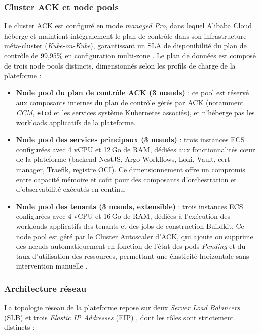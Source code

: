\subsubsection*{Cluster ACK et node pools}

Le cluster ACK est configuré en mode \textit{managed Pro}, dans lequel Alibaba Cloud héberge et maintient intégralement le plan de contrôle dans son infrastructure méta-cluster (\textit{Kube-on-Kube}), garantissant un SLA de disponibilité du plan de contrôle de 99,95\% en configuration multi-zone \cite{ack-ha}. Le plan de données est composé de trois node pools distincts, dimensionnés selon les profils de charge de la plateforme :

\begin{itemize}
	\item \textbf{Node pool du plan de contrôle ACK (3 nœuds)} : ce pool est réservé aux composants internes du plan de contrôle gérés par ACK (notamment \textit{CCM}, \texttt{etcd} et les services système Kubernetes associés), et n'héberge pas les workloads applicatifs de la plateforme.
	\item \textbf{Node pool des services principaux (3 nœuds)} : trois instances ECS configurées avec 4 vCPU et 12\,Go de RAM, dédiées aux fonctionnalités cœur de la plateforme (backend NestJS, Argo Workflows, Loki, Vault, cert-manager, Traefik, registre OCI). Ce dimensionnement offre un compromis entre capacité mémoire et coût pour des composants d'orchestration et d'observabilité exécutés en continu.
	\item \textbf{Node pool des tenants (3 nœuds, extensible)} : trois instances ECS configurées avec 4 vCPU et 16\,Go de RAM, dédiées à l'exécution des workloads applicatifs des tenants et des jobs de construction Buildkit. Ce node pool est géré par le Cluster Autoscaler d'ACK, qui ajoute ou supprime des nœuds automatiquement en fonction de l'état des pods \textit{Pending} et du taux d'utilisation des ressources, permettant une élasticité horizontale sans intervention manuelle \cite{ack-overview}.
\end{itemize}

\subsubsection*{Architecture réseau}

La topologie réseau de la plateforme repose sur deux \textit{Server Load Balancers} (SLB) \cite{alibaba-slb} et trois \textit{Elastic IP Addresses} (EIP) \cite{alibaba-eip}, dont les rôles sont strictement distincts :

